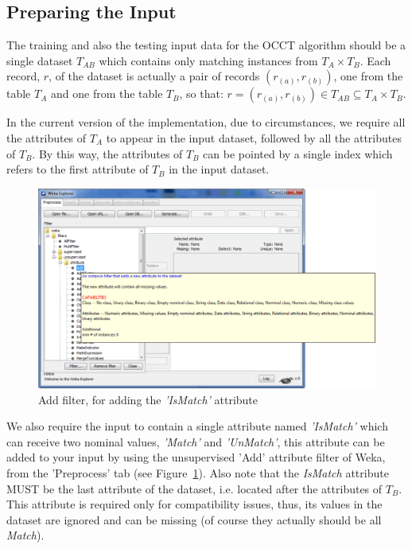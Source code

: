 \documentclass[a4paper,12pt]{article}
\begin{document}
\begin{spacing}{1.5}
\subsection{Preparing the Input}\label{sec:preparing_input}
The training and also the testing input data for the OCCT algorithm should be a single dataset $T_{AB}$ which contains only matching instances from $T_{A} \times T_{B}$. Each record, $r$, of the dataset is actually a pair of records $(r_{(a)},r_{(b)})$, one from the table $T_{A}$ and one from the table $T_{B}$, so that: $r=(r_{(a)},r_{(b)}) \in T_{AB} \subseteq T_{A} \times T_{B}$.

In the current version of the implementation, due to circumstances, we require all the attributes of $T_{A}$ to appear in the input dataset, followed by all the attributes of $T_{B}$. By this way, the attributes of $T_{B}$ can be pointed by a single index which refers to the first attribute of $T_{B}$ in the input dataset.

\begin{figure}[!h]
  \centering
  \includegraphics[width=1\textwidth]{Figures/GUI/PDF/AddFilter.pdf}
  \caption{Add filter, for adding the {\em 'IsMatch'} attribute}
  \label{fig:addfilter}
\end{figure}

We also require the input to contain a single attribute named {\em 'IsMatch'} which can receive two nominal values, {\em 'Match'} and {\em 'UnMatch'}, this attribute can be added to your input by using the unsupervised 'Add' attribute filter of Weka, from the 'Preprocess' tab (see Figure~\ref{fig:addfilter}).
Also note that the {\em IsMatch} attribute MUST be the last attribute of the dataset, i.e. located after the attributes of $T_{B}$. This attribute is required only for compatibility issues, thus, its values in the dataset are ignored and can be missing (of course they actually should be all {\em Match}). 

\end{spacing}
\end{document}
